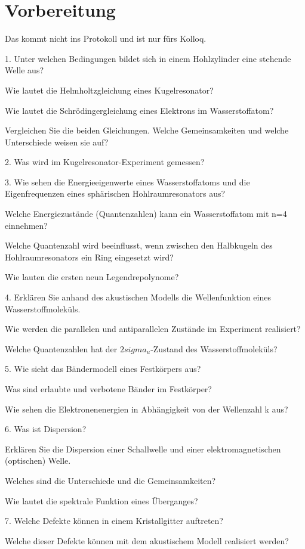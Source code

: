 \section{Vorbereitung}
Das kommt nicht ins Protokoll und ist nur fürs Kolloq.

1.
Unter welchen Bedingungen bildet sich in einem Hohlzylinder eine stehende Welle aus? 

Wie lautet die Helmholtzgleichung eines Kugelresonator? 

Wie lautet die Schrödingergleichung eines Elektrons im Wasserstoffatom? 

Vergleichen Sie die beiden Gleichungen. Welche Gemeinsamkeiten und welche Unterschiede weisen sie auf?

2.
Was wird im Kugelresonator-Experiment gemessen?

3.
Wie sehen die Energieeigenwerte eines Wasserstoffatoms und die Eigenfrequenzen eines sphärischen Hohlraumresonators aus?

Welche Energiezustände (Quantenzahlen) kann ein Wasserstoffatom mit n=4 einnehmen?

Welche Quantenzahl wird beeinflusst, wenn zwischen den Halbkugeln des Hohlraumresonators ein Ring eingesetzt wird? 

Wie lauten die ersten neun Legendrepolynome?

4.
Erklären Sie anhand des akustischen Modells die Wellenfunktion eines Wasserstoffmoleküls. 

Wie werden die parallelen und antiparallelen Zustände im Experiment realisiert? 

Welche Quantenzahlen hat der $2 sigma_u$-Zustand des Wasserstoffmoleküls?

5.
Wie sieht das Bändermodell eines Festkörpers aus? 

Was sind erlaubte und verbotene Bänder im Festkörper? 

Wie sehen die Elektronenenergien in Abhängigkeit von der Wellenzahl k aus?

6.
Was ist Dispersion? 

Erklären Sie die Dispersion einer Schallwelle und einer elektromagnetischen (optischen) Welle.

Welches sind die Unterschiede und die Gemeinsamkeiten? 

Wie lautet die spektrale Funktion eines Überganges?

7.
Welche Defekte können in einem Kristallgitter auftreten?

Welche dieser Defekte können mit dem akustischem Modell realisiert werden?